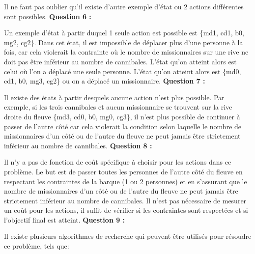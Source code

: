 \documentclass{article}
\begin{document}
Il ne faut pas oublier qu'il existe d'autre exemple d'état ou 2 actions différentes sont possibles.
\newline\newline
\textbf{Question  6 :}
\par Un exemple d'état à partir duquel 1 seule action est possible est \{md1, cd1, b0, mg2, cg2\}. Dans cet état, il est impossible de déplacer plus d'une personne à la fois, car cela violerait la contrainte où le nombre de missionnaires sur une rive ne doit pas être inférieur au nombre de cannibales. L'état qu'on atteint alors est celui où l'on a déplacé une seule personne. L'état qu'on atteint alors est \{md0, cd1, b0, mg3, cg2\} ou on a déplacé un missionnaire.
\newline\newline
\textbf{Question  7 :}
\par Il existe des états à partir desquels aucune action n'est plus possible. Par exemple, si les trois cannibales et aucun missionnaire se trouvent sur la rive droite du fleuve \{md3, cd0, b0, mg0, cg3\}, il n'est plus possible de continuer à passer de l'autre côté car cela violerait la condition selon laquelle le nombre de missionnaires d'un côté ou de l'autre du fleuve ne peut jamais être strictement inférieur au nombre de cannibales.
\newline\newline
\textbf{Question  8 :}
\par Il n'y a pas de fonction de coût spécifique à choisir pour les actions dans ce problème. Le but est de passer toutes les personnes de l'autre côté du fleuve en respectant les contraintes de la barque (1 ou 2 personnes) et en s'assurant que le nombre de missionnaires d'un côté ou de l'autre du fleuve ne peut jamais être strictement inférieur au nombre de cannibales. Il n'est pas nécessaire de mesurer un coût pour les actions, il suffit de vérifier si les contraintes sont respectées et si l'objectif final est atteint.
\newline\newline
\textbf{Question  9 :}
\par Il existe plusieurs algorithmes de recherche qui peuvent être utilisés pour résoudre ce problème, tels que:
\end{document}
